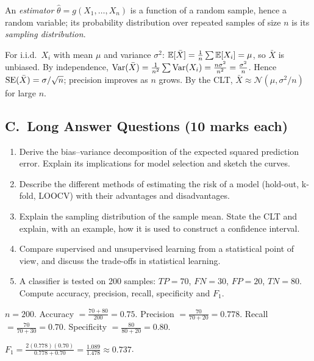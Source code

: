 \begin{modelans}
An \emph{estimator} $\hat\theta=g(X_1,\ldots,X_n)$ is a function of a random sample, hence a random variable; its probability distribution over repeated samples of size $n$ is its \emph{sampling distribution}.\par
For i.i.d.\ $X_i$ with mean $\mu$ and variance $\sigma^2$: $\mathbb{E}[\bar X]=\frac1n\sum\mathbb{E}[X_i]=\mu$, so $\bar X$ is unbiased. By independence, $\operatorname{Var}(\bar X)=\frac1{n^2}\sum\operatorname{Var}(X_i)=\frac{n\sigma^2}{n^2}=\frac{\sigma^2}{n}$. Hence $\operatorname{SE}(\bar X)=\sigma/\sqrt n$; precision improves as $n$ grows. By the CLT, $\bar X\approx\mathcal N(\mu,\sigma^2/n)$ for large $n$.
\end{modelans}

\subsection*{C.\ Long Answer Questions (10 marks each)}
\begin{enumerate}
  \item Derive the bias--variance decomposition of the expected squared prediction error. Explain its implications for model selection and sketch the curves. 
  \item Describe the different methods of estimating the risk of a model (hold-out, k-fold, LOOCV) with their advantages and disadvantages. 
  \item Explain the sampling distribution of the sample mean. State the CLT and explain, with an example, how it is used to construct a confidence interval. 
  \item Compare supervised and unsupervised learning from a statistical point of view, and discuss the trade-offs in statistical learning. 
  \item A classifier is tested on 200 samples: $TP=70$, $FN=30$, $FP=20$, $TN=80$. Compute accuracy, precision, recall, specificity and $F_1$. 
\end{enumerate}

\begin{modelans}[: C5 (numerical)]
$n=200$. Accuracy $=\frac{70+80}{200}=0.75$. Precision $=\frac{70}{70+20}=0.778$. Recall $=\frac{70}{70+30}=0.70$. Specificity $=\frac{80}{80+20}=0.80$.\par
$F_1=\frac{2(0.778)(0.70)}{0.778+0.70}=\frac{1.089}{1.478}\approx\mathbf{0.737}$.
\end{modelans}

